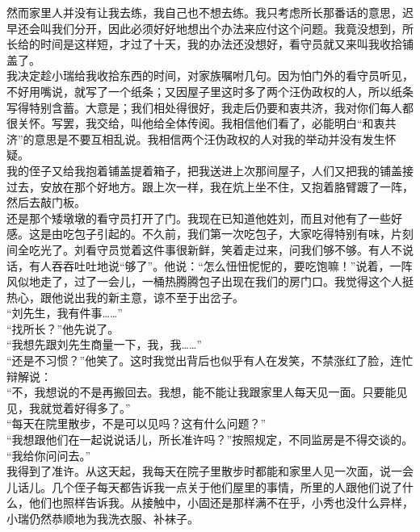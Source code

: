 然而家里人并没有让我去练，我自己也不想去练。我只考虑所长那番话的意思，迟早还会叫我们分开，因此必须好好地想出个办法来应付这个问题。我竟没想到，所长给的时间是这样短，才过了十天，我的办法还没想好，看守员就又来叫我收拾铺盖了。\\

我决定趁小瑞给我收拾东西的时间，对家族嘱咐几句。因为怕门外的看守员听见，不好用嘴说，就写了一个纸条；又因屋子里这时多了两个汪伪政权的人，所以纸条写得特别含蓄。大意是；我们相处得很好，我走后仍要和衷共济，我对你们每人都很关怀。写罢，我交给，叫他给全体传阅。我相信他们看了，必能明白“和衷共济”的意思是不要互相乱说。我相信两个汪伪政权的人对我的举动并没有发生怀疑。\\

我的侄子又给我抱着铺盖提着箱子，把我送进上次那间屋子，人们又把我的铺盖接过去，安放在那个好地方。跟上次一样，我在炕上坐不住，又抱着胳臂踱了一阵，然后去敲门板。\\

还是那个矮墩墩的看守员打开了门。我现在已知道他姓刘，而且对他有了一些好感。这是由吃包子引起的。不久前，我们第一次吃包子，大家吃得特别有味，片刻间全吃光了。刘看守员觉着这件事很新鲜，笑着走过来，问我们够不够。有人不说话，有人吞吞吐吐地说“够了”。他说：“怎么忸忸怩怩的，要吃饱嘛！”说着，一阵风似地走了，过了一会儿，一桶热腾腾包子出现在我们的房门口。我觉得这个人挺热心，跟他说出我的新主意，谅不至于出岔子。\\

“刘先生，我有件事……”\\

“找所长？”他先说了。\\

“我想先跟刘先生商量一下，我，我……”\\

“还是不习惯？”他笑了。这时我觉出背后也似乎有人在发笑，不禁涨红了脸，连忙辩解说：\\

“不，我想说的不是再搬回去。我想，能不能让我跟家里人每天见一面。只要能见见，我就觉着好得多了。”\\

“每天在院里散步，不是可以见吗？这有什么问题？”\\

“我想跟他们在一起说说话儿，所长准许吗？”按照规定，不同监房是不得交谈的。\\

“我给你问问去。”\\

我得到了准许。从这天起，我每天在院子里散步时都能和家里人见一次面，说一会儿话儿。几个侄子每天都告诉我一点关于他们屋里的事情，所里的人跟他们说了什么，他们也照样告诉我。从接触中，小固还是那样满不在乎，小秀也没什么异样，小瑞仍然恭顺地为我洗衣服、补袜子。\\

